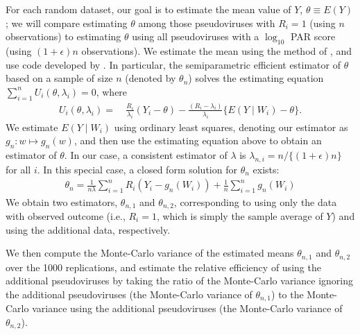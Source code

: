 \documentclass[10pt]{article}
\begin{document}
For each random dataset, our goal is to estimate the mean value of $Y$, $\theta \equiv E(Y)$; we will compare estimating $\theta$ among those pseudoviruses with $R_i = 1$ (using $n$ observations) to estimating $\theta$ using all pseudoviruses with a $\log_{10}$ PAR score (using $(1+\epsilon)n$ observations). We estimate the mean using the method of \citet{rotnitzky1995}, and use code developed by \citet{gilbert2014}. In particular, the semiparametric efficient estimator of $\theta$ based on a sample of size $n$ (denoted by $\theta_n$) solves the estimating equation $\sum_{i=1}^n U_i(\theta, \lambda_i) = 0$, where
\begin{align*}
    U_i(\theta, \lambda_i) =& \ \frac{R_i}{\lambda_i}(Y_i - \theta) - \frac{(R_i - \lambda_i)}{\lambda_i}\{E(Y \mid W_i) - \theta\}.
\end{align*}
We estimate $E(Y \mid W_i)$ using ordinary least squares, denoting our estimator as $g_n: w \mapsto g_n(w)$, and then use the estimating equation above to obtain an estimator of $\theta$. In our case, a consistent estimator of $\lambda$ is $\lambda_{n,i} = n / \{(1 + \epsilon)n\}$ for all $i$. In this special case, a closed form solution for $\theta_n$ exists:
\begin{align*}
    \theta_n = \frac{1}{n\lambda}\sum_{i=1}^nR_i(Y_i - g_n(W_i)) + \frac{1}{n}\sum_{i=1}^n g_n(W_i)
\end{align*}
 We obtain two estimators, $\theta_{n,1}$ and $\theta_{n,2}$, corresponding to using only the data with observed outcome (i.e., $R_i = 1$, which is simply the sample average of $Y$) and using the additional data, respectively.

We then compute the Monte-Carlo variance of the estimated means $\theta_{n,1}$ and $\theta_{n,2}$ over the 1000 replications, and estimate the relative efficiency of using the additional pseudoviruses by taking the ratio of the Monte-Carlo variance ignoring the additional pseudoviruses (the Monte-Carlo variance of $\theta_{n,1}$) to the Monte-Carlo variance using the additional pseudoviruses (the Monte-Carlo variance of $\theta_{n,2}$).
\end{document}
